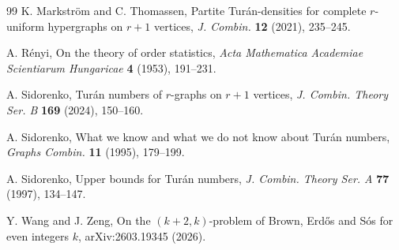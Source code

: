 \documentclass[12pt,a4paper]{article}
\numberwithin{equation}{section}
\theoremstyle{definition}
\theoremstyle{remark}
\begin{document}
\begin{thebibliography}{99}
K. Markstr\"om and C. Thomassen,
Partite Tur\'an-densities for complete $r$-uniform hypergraphs on $r+1$ vertices,
\emph{J. Combin.} \textbf{12} (2021), 235--245.

A. R\'enyi,
On the theory of order statistics,
\emph{Acta Mathematica Academiae Scientiarum Hungaricae} \textbf{4} (1953), 191--231.

A. Sidorenko,
Tur\'an numbers of $r$-graphs on $r+1$ vertices,
\emph{J. Combin. Theory Ser. B} \textbf{169} (2024), 150--160.



A. Sidorenko,
What we know and what we do not know about Tur\'an numbers,
\emph{Graphs Combin.} \textbf{11} (1995), 179--199.

A. Sidorenko,
Upper bounds for Tur\'an numbers,
\emph{J. Combin. Theory Ser. A} \textbf{77} (1997), 134--147.


Y. Wang and J. Zeng,
On the $(k+2,k)$-problem of Brown, Erd\H{o}s and S\'os for even integers $k$, arXiv:2603.19345 (2026).


\end{thebibliography}
\end{document}

